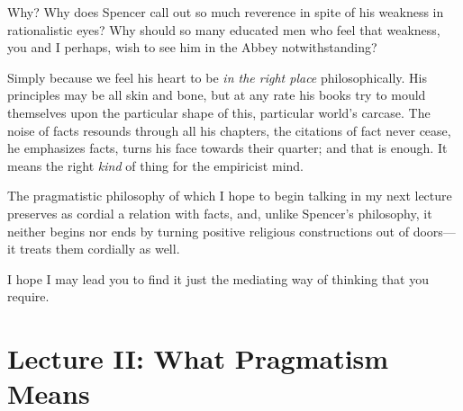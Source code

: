 \documentclass[]{article}
\begin{document}
Why? Why does Spencer call out so much reverence in spite of his
weakness in rationalistic eyes? Why should so many educated men who
feel that weakness, you and I perhaps, wish to see him in the Abbey
notwithstanding?

Simply because we feel his heart to be \emph{in the right place}
philosophically. His principles may be all skin and bone, but at any
rate his books try to mould themselves upon the particular shape of
this, particular world's carcase. The noise of facts resounds through
all his chapters, the citations of fact never cease, he emphasizes
facts, turns his face towards their quarter; and that is enough. It
means the right \emph{kind} of thing for the empiricist mind.

The pragmatistic philosophy of which I hope to begin talking in my
next lecture preserves as cordial a relation with facts, and, unlike
Spencer's philosophy, it neither begins nor ends by turning positive
religious constructions out of doors--- it treats them cordially as well.

I hope I may lead you to find it just the mediating way of thinking that
you require.


\section{Lecture II: What Pragmatism Means}
\end{document}
